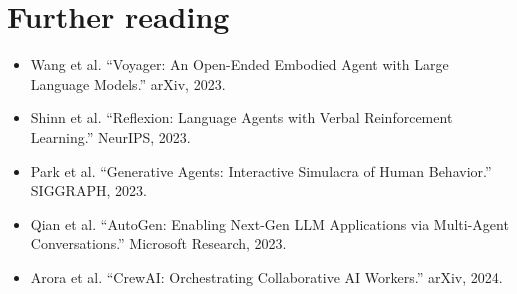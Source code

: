 \documentclass{article}
\begin{document}
\section*{Further reading}
\begin{itemize}
  \item Wang et al. ``Voyager: An Open-Ended Embodied Agent with Large Language Models.'' arXiv, 2023.
  \item Shinn et al. ``Reflexion: Language Agents with Verbal Reinforcement Learning.'' NeurIPS, 2023.
  \item Park et al. ``Generative Agents: Interactive Simulacra of Human Behavior.'' SIGGRAPH, 2023.
  \item Qian et al. ``AutoGen: Enabling Next-Gen LLM Applications via Multi-Agent Conversations.'' Microsoft Research, 2023.
  \item Arora et al. ``CrewAI: Orchestrating Collaborative AI Workers.'' arXiv, 2024.
\end{itemize}
\end{document}
